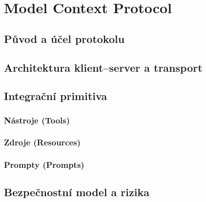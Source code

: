 \chapter{Model Context Protocol}
\label{ch:mcp}

\section{Původ a účel protokolu}

\section{Architektura klient–server a transport}

\section{Integrační primitiva}

\subsection{Nástroje (Tools)}

\subsection{Zdroje (Resources)}

\subsection{Prompty (Prompts)}

\section{Bezpečnostní model a rizika}
